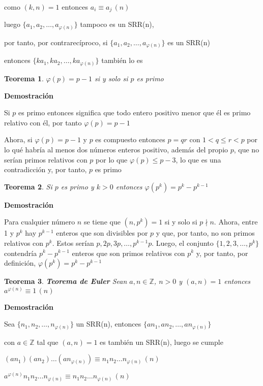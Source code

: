 \documentclass[a4paper,12pt]{report}
\newtheorem*{teo}{Teorema}
\begin{document}
como $(k,n)=1$ entonces $a_i\equiv a_j \, (n)$

luego $\{a_1,a_2,\dots,a_{\varphi(n)}\}$ tampoco es un SRR(n), 

por tanto, por contrarecíproco, si $\{a_1,a_2,\dots,a_{\varphi(n)}\}$ es un SRR(n) 

entonces $\{ka_1,ka_2,\dots,ka_{\varphi(n)}\}$ también lo es

\begin{teo}
 $\varphi(p)=p-1$ si y solo si $p$ es primo
\end{teo}

\textbf{Demostración}

Si $p$ es primo entonces significa que todo entero positivo menor que él es primo relativo con él, por tanto $\varphi(p)=p-1$

Ahora, si $\varphi(p)=p-1$ y $p$ es compuesto entonces $p=qr$ con $1<q\leq r <p$ por lo qué habría al menos dos números enteros positivo, además del propio $p$, que no serían primos relativos con $p$ por lo que $\varphi(p)\leq p-3$, lo que es una contradicción y, por tanto, $p$ es primo

\begin{teo}
 Si $p$ es primo y $k>0$ entonces $\varphi(p^k)=p^k - p^{k-1}$ 
\end{teo}

\textbf{Demostración}

Para cualquier número $n$ se tiene que $(n,p^k)=1$ si y solo si $p\nmid n$. Ahora, entre 1 y $p^k$ hay $p^{k-1}$ enteros que son divisibles por $p$ y que, por tanto, no son primos relativos con $p^k$. Estos serían $p,2p,3p,\dots,p^{k-1}p$. Luego, el conjunto $\{1,2,3,\dots,p^k\}$ contendría $p^k-p^{k-1}$ enteros que son primos relativos con $p^k$ y, por tanto, por definición, $\varphi(p^k)=p^k - p^{k-1}$ 

\begin{teo}
 \textbf{Teorema de Euler} Sean $a,n\in\mathbb{Z}$, $n>0$ y $(a,n)=1$ entonces $a^{\varphi(n)}\equiv 1\, (n)$
\end{teo}

\textbf{Demostración}

Sea $\{n_1,n_2,\dots,n_{\varphi(n)}\}$ un SRR(n), entonces $\{an_1,an_2,\dots,an_{\varphi(n)}\}$ 

con $a\in\mathbb{Z}$ tal que $(a,n)=1$ es también un SRR(n), luego se cumple

$(an_1)(an_2)\dots(an_{\varphi(n)})\equiv n_1 n_2 \dots n_{\varphi(n)} \, (n)$

$a^{\varphi(n)}n_1 n_2\dots n_{\varphi(n)}\equiv n_1 n_2 \dots n_{\varphi(n)} \, (n)$
\end{document}
